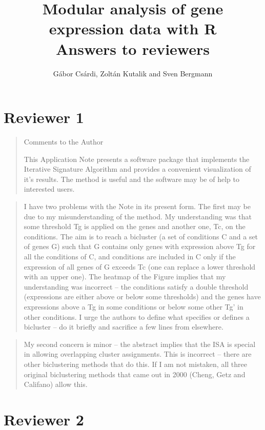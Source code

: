 \documentclass[a4paper]{article}
\title{Modular analysis of gene expression data with R\\
  Answers to reviewers}
\author{G\'abor Cs\'ardi, Zolt\'an Kutalik and Sven Bergmann}
\begin{document}
\maketitle

\section{Reviewer 1}

\begin{quote}
Comments to the Author

This Application Note presents a software package that implements the
Iterative Signature Algorithm and provides a convenient visualization
of it’s results. The method is useful and the software may be of help
to interested users. 
\end{quote}

\begin{quote}
I have two problems with the Note in its present form.
The first may be due to my misunderstanding of the method. My
understanding was that some threshold Tg is applied on the genes and
another one, Tc, on the conditions. The aim is to reach a bicluster (a
set of conditions C and a set of genes G) such that G contains only
genes with expression above Tg for all the conditions of C, and
conditions are included in C only if the expression of all genes of G
exceeds Tc (one can replace a lower threshold with an upper one). The
heatmap of the Figure implies that my understanding was incorrect –
the conditions satisfy a double threshold (expressions are either
above or below some thresholds) and the genes have expressions above a
Tg in some conditions or below some other Tg’ in other conditions. 
I urge the authors to define what specifies or defines a bicluster –
do it briefly and sacrifice a few lines from elsewhere. 
\end{quote}

\begin{quote}
My second concern is minor – the abstract implies that the ISA is
special in allowing overlapping cluster assignments. This is incorrect
– there are other biclustering methods that do this. If I am not
mistaken, all three original biclustering methods that came out in
2000 (Cheng, Getz and Califano) allow this. 
\end{quote}

\section{Reviewer 2}
\end{document}
